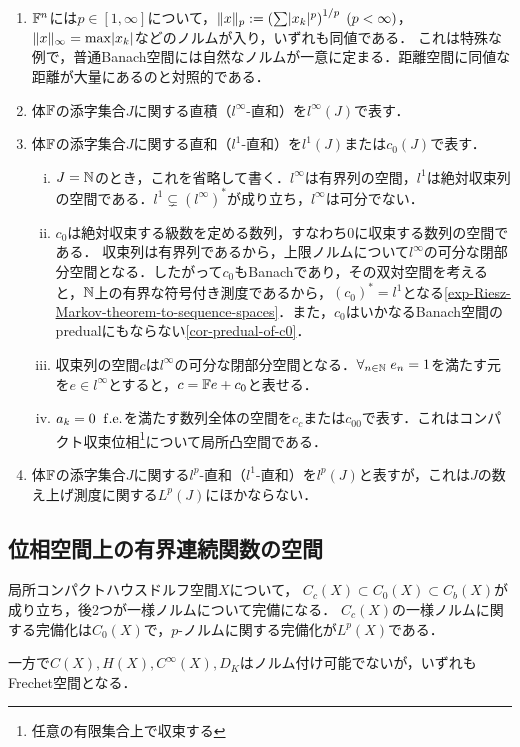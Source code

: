 \documentclass[uplatex,dvipdfmx]{jsreport}
\begin{document}
\begin{example}[体の積]\mbox{}
    \begin{enumerate}
        \item $\mathbb{F}^n$には$p\in[1,\infty]$について，$\|x\|_p:=\left(\sum\lvert x_k\rvert^p\right)^{1/p}\;(p<\infty)$，$\|x\|_\infty=\max\lvert x_k\rvert$などのノルムが入り，いずれも同値である．
        これは特殊な例で，普通Banach空間には自然なノルムが一意に定まる．距離空間に同値な距離が大量にあるのと対照的である．
        \item 体$\mathbb{F}$の添字集合$J$に関する直積（$l^\infty$-直和）を$l^\infty(J)$で表す．
        \item 体$\mathbb{F}$の添字集合$J$に関する直和（$l^1$-直和）を$l^1(J)$または$c_0(J)$で表す．
        \begin{enumerate}[(i)]
            \item $J=\mathbb{N}$のとき，これを省略して書く．$l^\infty$は有界列の空間，$l^1$は絶対収束列の空間である．$l^1\subsetneq(l^\infty)^*$が成り立ち，$l^\infty$は可分でない．
            \item $c_0$は絶対収束する級数を定める数列，すなわち$0$に収束する数列の空間である．
            収束列は有界列であるから，上限ノルムについて$l^\infty$の可分な閉部分空間となる．したがって$c_0$もBanachであり，その双対空間を考えると，$\mathbb{N}$上の有界な符号付き測度であるから，$(c_0)^*=l^1$となる\ref{exp-Riesz-Markov-theorem-to-sequence-spaces}．また，$c_0$はいかなるBanach空間のpredualにもならない\ref{cor-predual-of-c0}．
            \item 収束列の空間$c$は$l^\infty$の可分な閉部分空間となる．$\forall_{n\in\mathbb{N}}\;e_n=1$を満たす元を$e\in l^\infty$とすると，$c=\mathbb{F} e+c_0$と表せる．
            \item $a_k=0\;\;\mathrm{f.e.}$を満たす数列全体の空間を$c_c$または$c_{00}$で表す．これはコンパクト収束位相\footnote{任意の有限集合上で収束する}について局所凸空間である．
        \end{enumerate}
        \item 体$\mathbb{F}$の添字集合$J$に関する$l^p$-直和（$l^1$-直和）を$l^p(J)$と表すが，これは$J$の数え上げ測度に関する$L^p(J)$にほかならない．
    \end{enumerate}
\end{example}

\subsection{位相空間上の有界連続関数の空間}

\begin{tcolorbox}[colframe=ForestGreen, colback=ForestGreen!10!white,breakable,colbacktitle=ForestGreen!40!white,coltitle=black,fonttitle=\bfseries\sffamily,
title=]
    局所コンパクトハウスドルフ空間$X$について，
    $C_c(X)\subset C_0(X)\subset C_b(X)$が成り立ち，後2つが一様ノルムについて完備になる．
    $C_c(X)$の一様ノルムに関する完備化は$C_0(X)$で，$p$-ノルムに関する完備化が$L^p(X)$である．

    一方で$C(X),H(X),C^\infty(X),D_K$はノルム付け可能でないが，いずれもFrechet空間となる．
\end{tcolorbox}
\end{document}
